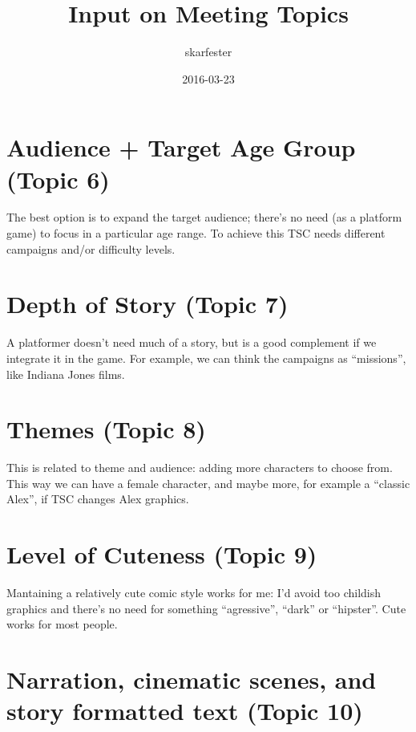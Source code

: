 \documentclass{gd-document}
\begin{document}
\title{Input on Meeting Topics}
\author{skarfester}
\date{2016-03-23}

\maketitle{}

\tableofcontents

\section{Audience + Target Age Group (Topic 6)}

The best option is to expand the target audience; there’s no need (as
a platform game) to focus in a particular age range. To achieve this
TSC needs different campaigns and/or difficulty levels.

\section{Depth of Story (Topic 7)}

A platformer doesn’t need much of a story, but is a good complement if
we integrate it in the game. For example, we can think the campaigns
as “missions”, like Indiana Jones films.

\section{Themes (Topic 8)}

This is related to theme and audience: adding more characters to
choose from. This way we can have a female character, and maybe more,
for example a “classic Alex”, if TSC changes Alex graphics.

\section{Level of Cuteness (Topic 9)}

Mantaining a relatively cute comic style works for me: I’d avoid too
childish graphics and there’s no need for something “agressive”,
“dark” or “hipster”. Cute works for most people.

\section{Narration, cinematic scenes, and story formatted text (Topic 10)}
\end{document}
